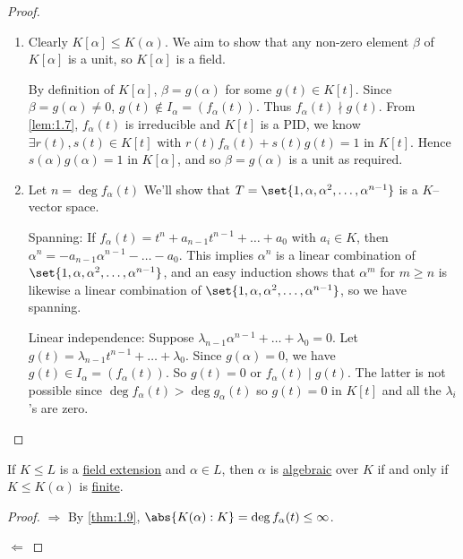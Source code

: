 \documentclass{article}
\begin{document}
\begin{proof}
    \leavevmode
    \begin{enumerate}[label=(\roman*)]
        \item Clearly $K[\alpha] \leq K(\alpha)$. We aim to show that any non-zero element $\beta$ of $K[\alpha]$ is a unit, so $K[\alpha]$ is a field.

            By definition of $K[\alpha]$, $\beta = g(\alpha)$ for some $g(t) \in K[t]$.  Since $\beta = g(\alpha) \neq 0$, $g(t) \notin I_\alpha = (f_\alpha(t))$.  Thus $f_\alpha(t) \nmid g(t)$.
            From \cref{lem:1.7}, $f_\alpha(t)$ is irreducible and $K[t]$ is a PID, we know $\exists r(t), s(t) \in K[t]$ with $r(t) f_\alpha(t) + s(t) g(t) = 1$ in $K[t]$.
            Hence $s(\alpha) g(\alpha) = 1$ in $K[\alpha]$, and so $\beta = g(\alpha)$ is a unit as required.
        \item Let $n = \deg f_\alpha(t)$ We'll show that $T = \set{1, \alpha, \alpha^2, \dotsc, \alpha^{n-1}}$ is a $K$--vector space.

            Spanning: If $f_\alpha(t) = t^n + a_{n-1} t^{n-1} + \dots + a_0$ with $a_i \in K$, then $\alpha^n = -a_{n-1} \alpha^{n-1} - \dots - a_0$.
            This implies $\alpha^n$ is a linear combination of $\set{1, \alpha, \alpha^2, \dotsc, \alpha^{n-1}}$, and an easy induction shows that $\alpha^m$ for $m \geq n$ is likewise a linear combination of $\set{1, \alpha, \alpha^2, \dotsc, \alpha^{n-1}}$, so we have spanning.

            Linear independence: Suppose $\lambda_{n-1} \alpha^{n-1} + \dotsc + \lambda_0 = 0$.
            Let $g(t) = \lambda_{n-1} t^{n-1} + \dotsc + \lambda_0$.  Since $g(\alpha) = 0$, we have $g(t) \in I_\alpha = (f_\alpha(t)).$  So $g(t) = 0$ or $f_\alpha(t) \mid g(t)$.
            The latter is not possible since $\deg f_\alpha(t) > \deg g_\alpha(t)$ so $g(t) = 0$ in $K[t]$ and all the $\lambda_i$'s are zero.
    \end{enumerate}
\end{proof}

\begin{ncor}\label{cor:1.10}
    If $K \leq L$ is a \hyperlink{def:fieldExt}{field extension} and $\alpha \in L$, then $\alpha$ is \hyperlink{def:algebraic}{algebraic} over $K$ if and only if $K \leq K(\alpha)$ is \hyperlink{def:degreeOfFieldExt}{finite}.
\end{ncor}

\begin{proof}
    $\Rightarrow$ By \cref{thm:1.9}, $\abs{K(\alpha):K} = \deg f_\alpha(t) \leq \infty$.

    $\Leftarrow$ 
\end{proof}
\end{document}
